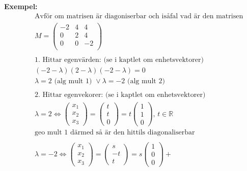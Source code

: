 \textbf{Exempel: }
\begin{align*}
  &\quad  \text{Avför om matrisen är diagoniserbar och isåfal vad är den matrisen} \\
  &\quad  M = 
  \left(\begin{array}{ccc}
   -2 & 4 & 4  \\
    0 & 2 & 4  \\
    0 & 0 & -2 \\
  \end{array}\right) \\
  &\quad  \\
  &\quad  \text{1. Hittar egenvärden: (se i kaptlet om enhetsvektorer) } \\
  &\quad  (-2-\lambda)(2-\lambda)(-2-\lambda)=0 \\
  &\quad  \lambda=2 \text{ (alg mult 1) } \lor{} \lambda=-2 \text{ (alg mult 2) } \\
  &\quad  \\
  &\quad  \text{2. Hittar egenvekorer: (se i kaptlet om enhetsvektorer) } \\
  &\quad  \lambda=2 \Leftrightarrow{}
  \begin{pmatrix} x_1 \\ x_2 \\ x_3 \end{pmatrix} =
  \begin{pmatrix} t \\ t \\ 0 \end{pmatrix} =
  t\begin{pmatrix} 1 \\ 1 \\ 0 \end{pmatrix}, \, t\in\mathbb{R} \\
  &\quad  \text{geo mult 1 därmed så är den hittils diagonaliserbar } \\
  &\quad  \\
  &\quad  \lambda=-2 \Leftrightarrow{}
  \begin{pmatrix} x_1 \\ x_2 \\ x_3 \end{pmatrix} =
  \begin{pmatrix} s \\ -t \\ t \end{pmatrix} =
  s\begin{pmatrix} 1 \\ 0 \\ 0 \end{pmatrix} +

\end{align*}
